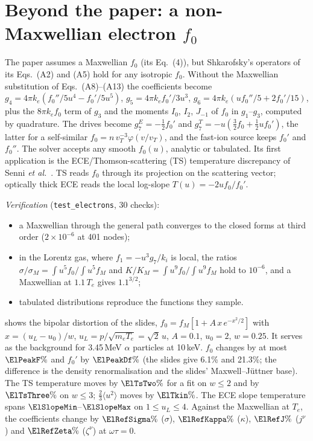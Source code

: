 \documentclass[11pt,a4paper]{article}
\newcommand{\ot}{\omega\tau}
\begin{document}
\section{Beyond the paper: a non-Maxwellian electron $f_0$}\label{sec:electrons}
The paper assumes a Maxwellian $f_0$ (its Eq.~(4)), but Shkarofsky's operators of its Eqs.~(A2) and (A5) hold for any
isotropic $f_0$. Without the Maxwellian substitution of Eqs.~(A8)--(A13) the coefficients become $g_4 = 4\pi k_e(f_0''/5u^4
- f_0'/5u^5)$, $g_5 = 4\pi k_e f_0'/3u^3$, $g_6 = 4\pi k_e(uf_0''/5 + 2f_0'/15)$, plus the $8\pi k_e f_0$ term of $g_3$ and
the moments $I_0$, $I_2$, $J_{-1}$ of $f_0$ in $g_1$--$g_3$, computed by quadrature. The drives become
$g_7^E=-\tfrac12 f_0'$ and $g_7^T=-u(\tfrac32f_0+\tfrac12uf_0')$, the latter for a self-similar
$f_0=n\,v_T^{-3}\varphi(v/v_T)$, and the fast-ion source keeps $f_0'$ and $f_0''$. The solver accepts any smooth $f_0(u)$,
analytic or tabulated. Its first application is the ECE/Thomson-scattering (TS) temperature discrepancy of Senni
\emph{et al.}~\cite{senni2026}. TS reads $f_0$ through its projection on the scattering vector; optically thick ECE reads
the local log-slope $T(u)=-2uf_0/f_0'$.

\emph{Verification} (\texttt{test\_electrons}, 30 checks):
\begin{itemize}
   \item a Maxwellian through the general path converges to the closed forms at third order ($2\times10^{-6}$ at 401
         nodes);
   \item in the Lorentz gas, where $f_1=-u^3g_7/k_i$ is local, the ratios $\sigma/\sigma_M=\int u^5f_0/\int u^5f_M$ and
         $K/K_M=\int u^9f_0/\int u^9f_M$ hold to $10^{-6}$, and a Maxwellian at $1.1\,T_e$ gives $1.1^{3/2}$;
   \item tabulated distributions reproduce the functions they sample.
\end{itemize}

 shows the bipolar distortion of the slides, $f_0=f_M[1+A\,x\,e^{-x^2/2}]$ with
$x=(u_L-u_0)/w$, $u_L=p/\sqrt{m_eT_e}=\sqrt2\,u$, $A=0.1$, $u_0=2$, $w=0.25$. It serves as the background for 3.45\,MeV
$\alpha$ particles at 10\,keV. $f_0$ changes by at most $\ElPeakF\%$ and $f_0'$ by $\ElPeakDf\%$ (the slides give 6.1\% and
21.3\%; the difference is the density renormalisation and the slides' Maxwell--J\"uttner base). The TS temperature moves by
$\ElTsTwo\%$ for a fit on $w\le2$ and by $\ElTsThree\%$ on $w\le3$; $\tfrac23\langle u^2\rangle$ moves by $\ElTkin\%$. The
ECE slope temperature spans $\ElSlopeMin$--$\ElSlopeMax$ on $1\le u_L\le4$. Against the Maxwellian at $T_e$, the
coefficients change by $\ElRefSigma\%$ ($\sigma$), $\ElRefKappa\%$ ($\kappa$), $\ElRefJ\%$ ($j^\nu$) and $\ElRefZeta\%$
($\zeta^\nu$) at $\ot=0$.
\end{document}
